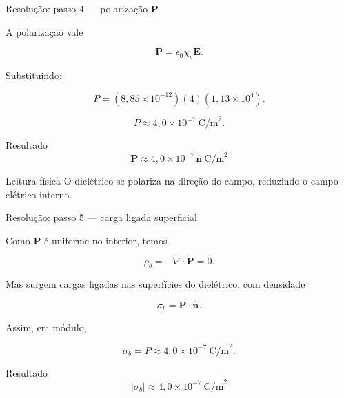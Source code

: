 \documentclass[aspectratio=169]{beamer}
\begin{document}

\begin{frame}{Resolução: passo 4 --- polarização \(\mathbf P\)}

A polarização vale

\begin{equation}
\mathbf P = \epsilon_0 \chi_e \mathbf E.
\end{equation}

Substituindo:

\begin{equation}
P
=
(8{,}85\times 10^{-12})(4)(1{,}13\times 10^4).
\end{equation}

\begin{equation}
P \approx 4{,}0\times 10^{-7}\ \text{C/m}^2.
\end{equation}

\begin{alertblock}{Resultado}
\begin{equation}
\mathbf P \approx 4{,}0\times 10^{-7}\,\hat{\mathbf n}\ \text{C/m}^2
\end{equation}
\end{alertblock}

\begin{block}{Leitura física}
O dielétrico se polariza na direção do campo, reduzindo o campo elétrico interno.
\end{block}

\end{frame}


\begin{frame}{Resolução: passo 5 --- carga ligada superficial}

Como \(\mathbf P\) é uniforme no interior, temos

\begin{equation}
\rho_b = -\nabla\cdot \mathbf P = 0.
\end{equation}

Mas surgem cargas ligadas nas superfícies do dielétrico, com densidade

\begin{equation}
\sigma_b = \mathbf P \cdot \hat{\mathbf n}.
\end{equation}

Assim, em módulo,

\begin{equation}
\sigma_b = P \approx 4{,}0\times 10^{-7}\ \text{C/m}^2.
\end{equation}

\begin{alertblock}{Resultado}
\begin{equation}
|\sigma_b| \approx 4{,}0\times 10^{-7}\ \text{C/m}^2
\end{equation}
\end{alertblock}

\end{frame}
\end{document}
